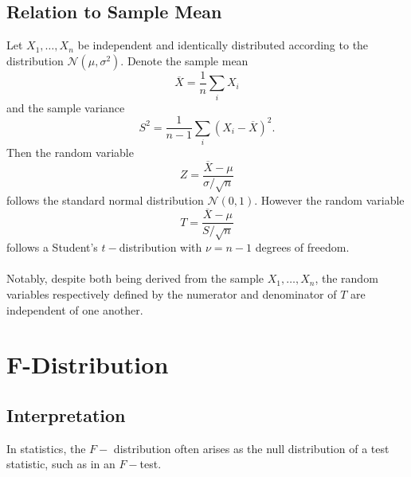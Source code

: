 \documentclass[1pt]{report}
\newcommand{\<}{\langle}
\renewcommand{\>}{\rangle}
\renewcommand{\bar}{\overline}
\newcommand{\NN}{\mathcal{N}}
\begin{document}
\subsection{Relation to Sample Mean}
Let $X_1, \dots, X_n$ be independent and identically distributed according to the distribution $\NN(\mu, \sigma^2)$. Denote the sample mean
$$\bar X = \frac{1}{n} \sum\limits_i X_i$$
and the sample variance
$$S^2 = \frac{1}{n-1}\sum\limits_i (X_i - \bar X)^2.$$
Then the random variable
$$Z = \frac{\bar X - \mu}{\sigma/\sqrt{n}}$$
follows the standard normal distribution $\NN(0,1)$. However the random variable
$$T = \frac{\bar X - \mu}{S/\sqrt{n}}$$
follows a Student's $t-$distribution with $\nu = n-1$ degrees of freedom.\\
\\
Notably, despite both being derived from the sample $X_1, \dots, X_n$, the random variables respectively defined by the numerator and denominator of $T$ are independent of one another.
\newpage
\section[$F-$Distribution]{$\boldsymbol{F}$-Distribution}
\subsection{Interpretation} 
In statistics, the $F-$ distribution often arises as the null distribution of a test statistic, such as in an $F-$test.
\end{document}
